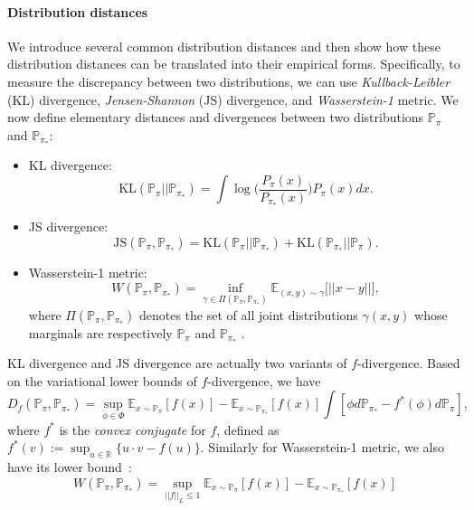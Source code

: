 \paragraph{Distribution distances}
We introduce several common distribution distances and then show how these distribution distances can be translated into their empirical forms. Specifically, to measure the discrepancy between two distributions, we can use \textit{Kullback-Leibler} (KL) divergence, \textit{Jensen-Shannon} (JS) divergence, and \textit{Wasserstein-1} metric. We now define elementary distances and divergences between two distributions $\mathbb{P}_\pi$ and $\mathbb{P}_{\pi_*}$:
\begin{itemize}
    \item KL divergence: 
    \begin{equation*}
    \text{KL}(\mathbb{P}_\pi || \mathbb{P}_{\pi_*}) = \int \log\Big( \frac{P_\pi(x)}{P_{\pi_*}(x)} \Big) P_{\pi}(x) dx .
    \end{equation*}
    
    \item JS divergence:
    \begin{equation*}
    \text{JS}(\mathbb{P}_{\pi}, \mathbb{P}_{\pi_*}) = \text{KL}(\mathbb{P}_\pi || \mathbb{P}_{\pi_*}) + \text{KL}(\mathbb{P}_{\pi_*} || \mathbb{P}_{\pi}).
    \end{equation*}
    
    \item Wasserstein-1 metric:
    \begin{equation*}
    W(\mathbb{P}_{\pi}, \mathbb{P}_{\pi_*}) = \inf_{\gamma\in\Pi(\mathbb{P}_{\pi}, \mathbb{P}_{\pi_*})} \mathbb{E}_{(x, y)\sim\gamma}\big[ ||x-y|| \big], 
    \end{equation*}
    where $\Pi(\mathbb{P}_{\pi}, \mathbb{P}_{\pi_*})$ denotes the set of all joint distributions $\gamma(x, y)$ whose marginals are respectively $\mathbb{P}_{\pi}$ and $\mathbb{P}_{\pi_*}$ .
\end{itemize}
KL divergence and JS divergence are actually two variants of $f$-divergence. Based on the variational lower bounds of $f$-divergence\citep{nguyen2010estimating}, we have
\begin{equation*}
D_{f} (\mathbb{P}_{\pi}, \mathbb{P}_{\pi_*}) = \sup_{\phi\in \Phi} \mathbb{E}_{x\sim\mathbb{P}_\pi}[f(x)] - \mathbb{E}_{x\sim\mathbb{P}_{\pi_*}}[f(x)] \int [\phi d\mathbb{P}_{\pi_*} - f^*(\phi) d\mathbb{P}_{\pi} ], 
\end{equation*}
where $f^*$ is the \textit{convex conjugate} for $f$, defined as $f^*(v) := \sup_{u\in\mathbb{R}} \{ u \cdot v - f(u) \}$. Similarly for Wasserstein-1 metric, we also have its lower bound~\citep{villani2008optimal}:
\begin{equation*}
W(\mathbb{P}_{\pi}, \mathbb{P}_{\pi_*}) = \sup_{||f||_{L}\leq 1} \mathbb{E}_{x\sim\mathbb{P}_\pi}[f(x)] - \mathbb{E}_{x\sim\mathbb{P}_{\pi_*}}[f(x)]
\end{equation*}

